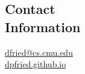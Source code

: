 \documentclass[10pt,resmargin,line]{resume}
\newcommand{\mailto}[1]{
  \href{mailto:#1}{#1}
}
\begin{document}
\begin{resume}

\section{Contact\\Information}
\mailto{dfried@cs.cmu.edu} \\
{\small \url{dpfried.github.io}}







\end{resume}
\end{document}
